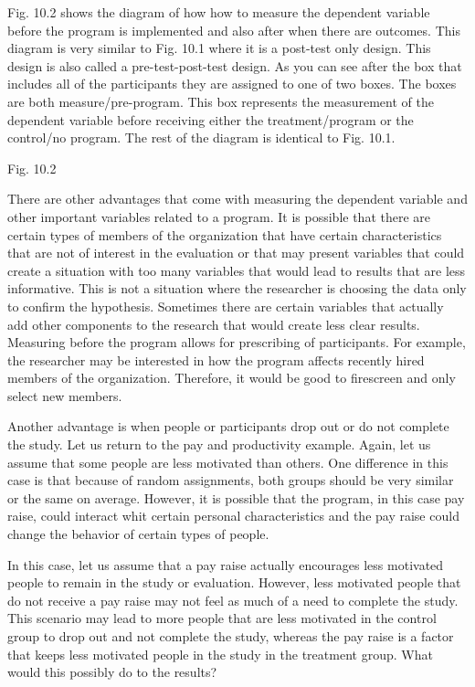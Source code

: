 \documentclass[]{book}
\theoremstyle{definition}
\theoremstyle{definition}
\theoremstyle{definition}
\theoremstyle{remark}
\begin{document}
Fig. 10.2 shows the diagram of how how to measure the dependent variable
before the program is implemented and also after when there are
outcomes. This diagram is very similar to Fig. 10.1 where it is a
post-test only design. This design is also called a pre-test-post-test
design. As you can see after the box that includes all of the
participants they are assigned to one of two boxes. The boxes are both
measure/pre-program. This box represents the measurement of the
dependent variable before receiving either the treatment/program or the
control/no program. The rest of the diagram is identical to Fig. 10.1.

Fig. 10.2

There are other advantages that come with measuring the dependent
variable and other important variables related to a program. It is
possible that there are certain types of members of the organization
that have certain characteristics that are not of interest in the
evaluation or that may present variables that could create a situation
with too many variables that would lead to results that are less
informative. This is not a situation where the researcher is choosing
the data only to confirm the hypothesis. Sometimes there are certain
variables that actually add other components to the research that would
create less clear results. Measuring before the program allows for
prescribing of participants. For example, the researcher may be
interested in how the program affects recently hired members of the
organization. Therefore, it would be good to firescreen and only select
new members.

Another advantage is when people or participants drop out or do not
complete the study. Let us return to the pay and productivity example.
Again, let us assume that some people are less motivated than others.
One difference in this case is that because of random assignments, both
groups should be very similar or the same on average. However, it is
possible that the program, in this case pay raise, could interact whit
certain personal characteristics and the pay raise could change the
behavior of certain types of people.

In this case, let us assume that a pay raise actually encourages less
motivated people to remain in the study or evaluation. However, less
motivated people that do not receive a pay raise may not feel as much of
a need to complete the study. This scenario may lead to more people that
are less motivated in the control group to drop out and not complete the
study, whereas the pay raise is a factor that keeps less motivated
people in the study in the treatment group. What would this possibly do
to the results?
\end{document}
